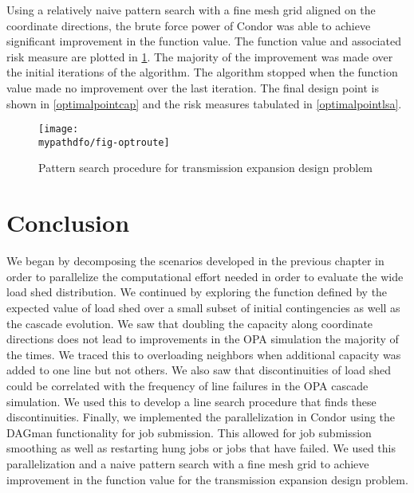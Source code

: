 Using a relatively naive pattern search with a fine mesh grid aligned on the coordinate directions, the brute force power of Condor was able to achieve significant improvement in the function value.  The function value and associated risk measure are plotted in \cref{fig:opt1}.  The majority of the improvement was made over the initial iterations of the algorithm.  The algorithm stopped when the function value made no improvement over the last iteration.  The final design point is shown in \cref{optimalpointcap} and the risk measures tabulated in \cref{optimalpointlsa}.


\linespread{1}


\linespread{2}


\begin{figure}
\begin{center}
\texttt{[image: \\mypathdfo/fig-optroute]}
 \caption{Pattern search procedure for transmission expansion design problem}
 \label{fig:opt1}
\end{center}
\end{figure}






\section{Conclusion}
We began by decomposing the scenarios developed in the previous chapter in order to parallelize the computational effort needed in order to evaluate the wide load shed distribution.  We continued by exploring the function defined by the expected value of load shed over a small subset of initial contingencies as well as the cascade evolution.  We saw that doubling the capacity along coordinate directions does not lead to improvements in the OPA simulation the majority of the times.  We traced this to overloading neighbors when additional capacity was added to one line but not others.  We also saw that discontinuities of load shed could be correlated with the frequency of line failures in the OPA cascade simulation.  We used this to develop a line search procedure that finds these discontinuities. Finally, we implemented the parallelization in Condor using the DAGman functionality for job submission.  This allowed for job submission smoothing as well as restarting hung jobs or jobs that have failed.  We used this parallelization and a naive pattern search with a fine mesh grid to achieve improvement in the function value for the transmission expansion design problem.



